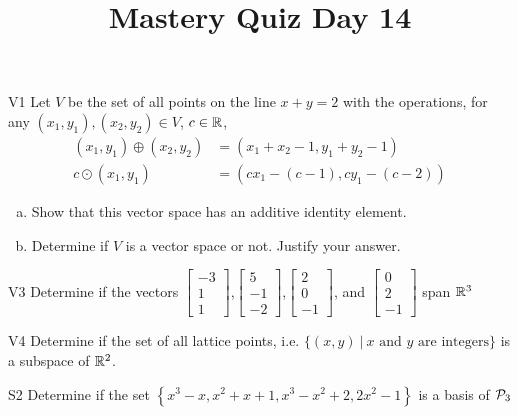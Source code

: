 \documentclass{sbgLAquiz}
\title{Mastery Quiz Day 14 }
\begin{document}
\begin{problem}{V1}
Let $V$ be the set of all points on the line $x+y=2$ with the operations, for any $(x_1,y_1), (x_2,y_2) \in V$, $c \in \IR$,
\begin{align*}
(x_1,y_1) \oplus (x_2,y_2) &= (x_1+x_2-1,y_1+y_2-1) \\
c \odot (x_1,y_1) &= (cx_1-(c-1), cy_1-(c-2))
\end{align*}
\begin{enumerate}[(a)]
\item Show that this vector space has an additive identity element.
\item Determine if $V$ is a vector space or not.  Justify your answer.
\end{enumerate}
\end{problem}

\begin{problem}{V3}
Determine if the vectors  $\begin{bmatrix} -3 \\ 1 \\ 1 \end{bmatrix}$,$\begin{bmatrix} 5 \\ -1 \\ -2 \end{bmatrix}$,$\begin{bmatrix}2 \\ 0 \\ -1 \end{bmatrix}$, and $\begin{bmatrix} 0 \\ 2 \\ -1\end{bmatrix}$ span $\IR^3$
\end{problem}
\newpage

\begin{problem}{V4}
Determine if the set of all lattice points, i.e. $\{(x,y)\ \big|\ \text{$x$ and $y$ are integers} \}$ is a subspace of $\IR^2$.
\end{problem}

\begin{problem}{S2}
Determine if the set $\left\{ x^3-x, x^2+x+1, x^3-x^2+2, 2x^2-1 \right\}$ is a basis of $\P_3$
\end{problem}
\end{document}
